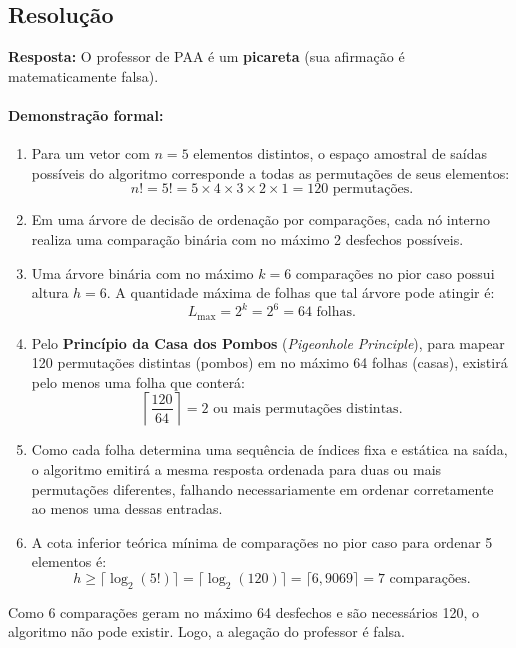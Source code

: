 \documentclass[11pt,a4paper]{article}
\begin{document}
\subsection*{Resolução}
\textbf{Resposta:} O professor de PAA é um \textbf{picareta} (sua afirmação é matematicamente falsa).

\paragraph{Demonstração formal:}
\begin{enumerate}
    \item Para um vetor com $n = 5$ elementos distintos, o espaço amostral de saídas possíveis do algoritmo corresponde a todas as permutações de seus elementos:
    \[
        n! = 5! = 5 \times 4 \times 3 \times 2 \times 1 = 120 \text{ permutações}.
    \]
    \item Em uma árvore de decisão de ordenação por comparações, cada nó interno realiza uma comparação binária com no máximo 2 desfechos possíveis.
    \item Uma árvore binária com no máximo $k = 6$ comparações no pior caso possui altura $h = 6$. A quantidade máxima de folhas que tal árvore pode atingir é:
    \[
        L_{\max} = 2^k = 2^6 = 64 \text{ folhas}.
    \]
    \item Pelo \textbf{Princípio da Casa dos Pombos} (\emph{Pigeonhole Principle}), para mapear 120 permutações distintas (pombos) em no máximo 64 folhas (casas), existirá pelo menos uma folha que conterá:
    \[
        \left\lceil \frac{120}{64} \right\rceil = 2 \text{ ou mais permutações distintas}.
    \]
    \item Como cada folha determina uma sequência de índices fixa e estática na saída, o algoritmo emitirá a mesma resposta ordenada para duas ou mais permutações diferentes, falhando necessariamente em ordenar corretamente ao menos uma dessas entradas.
    \item A cota inferior teórica mínima de comparações no pior caso para ordenar 5 elementos é:
    \[
        h \ge \lceil \log_2(5!) \rceil = \lceil \log_2(120) \rceil = \lceil 6{,}9069 \rceil = 7 \text{ comparações}.
    \]
\end{enumerate}
Como 6 comparações geram no máximo 64 desfechos e são necessários 120, o algoritmo não pode existir. Logo, a alegação do professor é falsa.

\vspace{0.2cm}

\end{document}
